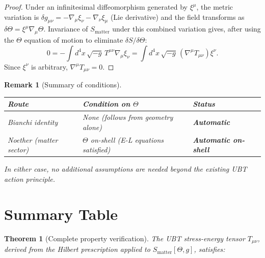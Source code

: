 \documentclass[12pt]{article}
\newtheorem{theorem}[definition]{Theorem}
\newtheorem{remark}[definition]{Remark}
\begin{document}
\begin{proof}
  Under an infinitesimal diffeomorphism generated by $\xi^\mu$,
  the metric variation is $\delta g_{\mu\nu} = -\nabla_\mu\xi_\nu
  - \nabla_\nu\xi_\mu$ (Lie derivative) and the field transforms as
  $\delta\Theta = \xi^\mu\nabla_\mu\Theta$.
  Invariance of $S_{\mathrm{matter}}$ under this combined variation gives,
  after using the $\Theta$ equation of motion to eliminate $\delta S/\delta\Theta$:
  \begin{equation}
    0 = -\int d^4x\,\sqrt{-g}\,T^{\mu\nu}\nabla_\mu\xi_\nu
      = \int d^4x\,\sqrt{-g}\,(\nabla^\mu T_{\mu\nu})\xi^\nu.
  \end{equation}
  Since $\xi^\nu$ is arbitrary, $\nabla^\mu T_{\mu\nu} = 0$.
\end{proof}

\begin{remark}[Summary of conditions]
\label{rem:conditions}
\begin{center}
\begin{tabular}{|l|l|l|}
\hline
\textbf{Route} & \textbf{Condition on $\Theta$} & \textbf{Status} \\
\hline
Bianchi identity
  & None (follows from geometry alone)
  & \textbf{Automatic} \\
\hline
Noether (matter sector)
  & $\Theta$ on-shell (E-L equations satisfied)
  & \textbf{Automatic on-shell} \\
\hline
\end{tabular}
\end{center}
In either case, no additional assumptions are needed beyond the
existing UBT action principle.
\end{remark}

\section{Summary Table}

\begin{theorem}[Complete property verification]
\label{thm:summary}
The UBT stress-energy tensor $T_{\mu\nu}$, derived from the Hilbert
prescription applied to $S_{\mathrm{matter}}[\Theta, g]$, satisfies:
\end{theorem}
\end{document}
